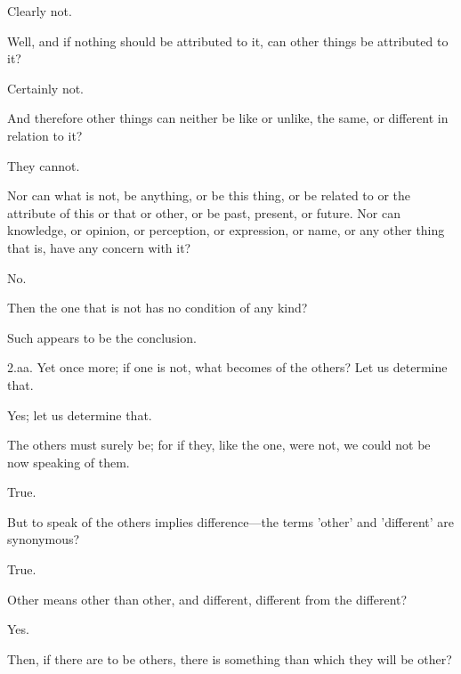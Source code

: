 \documentclass[11pt,letter]{article}
\begin{document}
\par  Clearly not.

\par  Well, and if nothing should be attributed to it, can other things be attributed to it?

\par  Certainly not.

\par  And therefore other things can neither be like or unlike, the same, or different in relation to it?

\par  They cannot.

\par  Nor can what is not, be anything, or be this thing, or be related to or the attribute of this or that or other, or be past, present, or future. Nor can knowledge, or opinion, or perception, or expression, or name, or any other thing that is, have any concern with it?

\par  No.

\par  Then the one that is not has no condition of any kind?

\par  Such appears to be the conclusion.

\par  2.aa. Yet once more; if one is not, what becomes of the others? Let us determine that.

\par  Yes; let us determine that.

\par  The others must surely be; for if they, like the one, were not, we could not be now speaking of them.

\par  True.

\par  But to speak of the others implies difference—the terms 'other' and 'different' are synonymous?

\par  True.

\par  Other means other than other, and different, different from the different?

\par  Yes.

\par  Then, if there are to be others, there is something than which they will be other?
\end{document}
